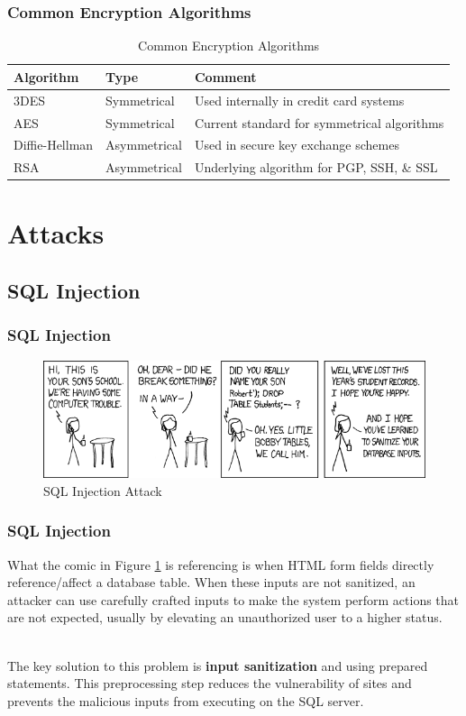 \documentclass[aspectratio=169]{beamer}
\begin{document}
\begin{frame}
\frametitle{Common Encryption Algorithms}
\begin{table}
\begin{tabular}{|l|l|p{4cm}|}
\hline
\textbf{Algorithm} & \textbf{Type} & \textbf{Comment}\\
\hline
3DES & Symmetrical & Used internally in credit card systems\\
\hline
AES & Symmetrical & Current standard for symmetrical algorithms\\
\hline
Diffie-Hellman & Asymmetrical & Used in secure key exchange schemes\\
\hline
RSA & Asymmetrical & Underlying algorithm for PGP, SSH, \& SSL\\
\hline
\end{tabular}
\caption{Common Encryption Algorithms}
\label{tbl:algorithms}
\end{table}
\end{frame}

\section{Attacks}
\subsection{SQL Injection}
\begin{frame}
\frametitle{SQL Injection}
\begin{figure}
\includegraphics[scale=0.6]{../artifacts/bobby-tables.png}
\caption{SQL Injection Attack \cite{xkcd}}
\label{fig:bobbytables}
\end{figure}
\end{frame}

\begin{frame}
\frametitle{SQL Injection}
What the comic in Figure \ref{fig:bobbytables} is referencing is when HTML form fields directly reference/affect a database table. When these inputs are not sanitized, an attacker can use carefully crafted inputs to make the system perform actions that are not expected, usually by elevating an unauthorized user to a higher status.

\mbox{}\\
The key solution to this problem is \textbf{input sanitization} and using prepared statements. This preprocessing step reduces the vulnerability of sites and prevents the malicious inputs from executing on the SQL server.
\end{frame}
\end{document}
